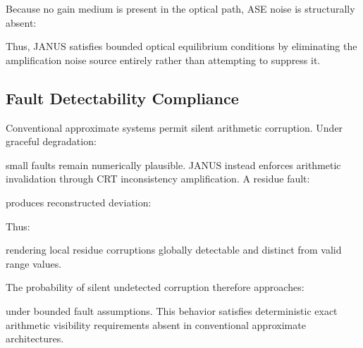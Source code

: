 \documentclass[journal]{IEEEtran}
\begin{document}
\begin{center}
\end{center}

Because no gain medium is present in the optical path, ASE noise is structurally absent:

\begin{center}
\end{center}

Thus, JANUS satisfies bounded optical equilibrium conditions by eliminating the amplification noise source entirely rather than attempting to suppress it.

\subsection{\textbf{Fault Detectability Compliance}}

Conventional approximate systems permit silent arithmetic corruption.
Under graceful degradation:

\begin{center}
\end{center}

small faults remain numerically plausible.
JANUS instead enforces arithmetic invalidation through CRT inconsistency amplification.
A residue fault:

\begin{center}
\end{center}

produces reconstructed deviation:

\begin{center}
\end{center}

Thus:
\begin{center}
\end{center}

rendering local residue corruptions globally detectable and distinct from valid range values.

The probability of silent undetected corruption therefore approaches:

\begin{center}
\end{center}

under bounded fault assumptions. This behavior satisfies deterministic exact arithmetic visibility requirements absent in conventional approximate architectures.
\end{document}
